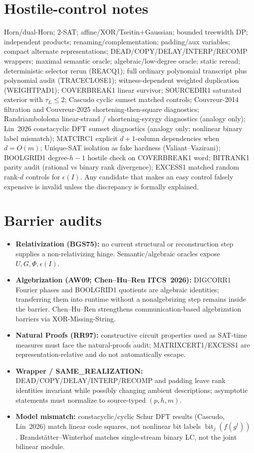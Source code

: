 \documentclass[11pt]{article}
\begin{document}
\section*{Hostile-control notes}
Horn/dual-Horn; 2-SAT; affine/XOR/Tseitin$+$Gaussian; bounded treewidth DP; independent products;
renaming/complementation; padding/aux variables; compact alternate representations;
DEAD/COPY/DELAY/INTERP/RECOMP wrappers; maximal semantic oracle; algebraic/low-degree oracle;
static reread; deterministic selector rerun (REACQ1); full ordinary polynomial transcript plus
polynomial audit (TRACECLOSE1); witness-dependent weighted duplication (WEIGHTPAD1);
COVERBREAK1 linear survivor; SOURCEDIR1 saturated exterior with $\tau_L\le 2$; Cascudo cyclic
sumset matched controls; Couvreur-2014 filtration and Couvreur-2025 shortening-then-square
diagnostics; Randriambololona linear-strand / shortening-syzygy diagnostics (analogy only);
Lin~2026 constacyclic DFT sumset diagnostics (analogy only; nonlinear binary label mismatch);
MATCIRC1 explicit $d+1$-column dependencies when $d=O(m)$; Unique-SAT isolation as fake
hardness (Valiant--Vazirani); BOOLGRID1 degree-$h-1$ hostile check on COVERBREAK1 word;
BITRANK1 parity audit (rational vs binary rank divergence); EXCESS1 matched random rank-$d$
controls for $\epsilon(I)$.
Any candidate that makes an easy control falsely expensive is invalid unless the discrepancy
is formally explained.

\section*{Barrier audits}
\begin{itemize}
\item \textbf{Relativization (BGS75):} no current structural or reconstruction step supplies a
non-relativizing hinge. Semantic/algebraic oracles expose $U,G,\Phi,\epsilon(I)$.
\item \textbf{Algebrization (AW09; Chen--Hu--Ren ITCS~2026):} DIGCORR1 Fourier phases and
BOOLGRID1 quotients are algebraic identities; transferring them into runtime without a
nonalgebrizing step remains inside the barrier. Chen--Hu--Ren strengthens communication-based
algebrization barriers via XOR-Missing-String.
\item \textbf{Natural Proofs (RR97):} constructive circuit properties used as SAT-time measures
must face the natural-proofs audit; MATRIXCERT1/EXCESS1 are representation-relative and do
not automatically escape.
\item \textbf{Wrapper / SAME\_REALIZATION:} DEAD/COPY/DELAY/INTERP/RECOMP and padding leave
rank identities invariant while possibly changing ambient descriptions; asymptotic statements
must normalize to source-typed $(p,h,m)$.
\item \textbf{Model mismatch:} constacyclic/cyclic Schur DFT results (Cascudo, Lin~2026) match
linear code squares, not nonlinear bit labels $\operatorname{bit}_j(f(g^t))$. Brandst\"atter--Winterhof
matches single-stream binary LC, not the joint bilinear module.
\end{itemize}
\end{document}
